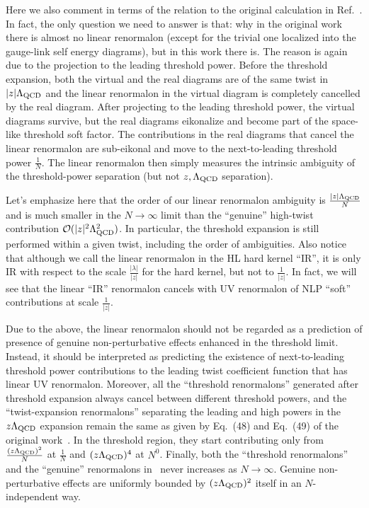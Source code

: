 \documentclass[a4paper,11pt]{article}
\begin{document}
Here we also comment in terms of the relation to the original calculation in Ref.~\cite{Braun:2018brg}. In fact, the only question we need to answer is that: why in the original work there is almost no linear renormalon (except for the trivial one localized into the gauge-link self energy diagrams), but in this work there is. The reason is again due to the projection to the leading threshold power. Before the threshold expansion, both the virtual and the real diagrams are of the same twist in $|z|\Lambda_{\rm QCD}$ and the linear renormalon in the virtual diagram is completely cancelled by the real diagram. After projecting to the leading threshold power, the virtual diagrams survive, but the real diagrams eikonalize and become part of the space-like threshold soft factor. The contributions in the real diagrams that cancel the linear renormalon are sub-eikonal and move to the next-to-leading threshold power $\frac{1}{N}$. The linear renormalon then simply measures the intrinsic ambiguity of the threshold-power separation (but not $z,\Lambda_{\rm QCD}$ separation).

Let's emphasize here that the order of our linear renormalon ambiguity is $\frac{|z|\Lambda_{\rm QCD}}{N}$ and is much smaller in the $N\rightarrow \infty$ limit than the ``genuine'' high-twist contribution ${\cal O}(|z|^2\Lambda^2_{\rm QCD})$. In particular, the threshold expansion is still performed within a given twist, including the order of ambiguities. Also notice that although we call the linear renormalon in the HL hard kernel ``IR'', it is only IR with respect to the scale $\frac{|\lambda|}{|z|}$ for the hard kernel, but not to $\frac{1}{|z|}$. In fact, we will see that the linear ``IR'' renormalon cancels with UV renormalon of NLP ``soft'' contributions at scale $\frac{1}{|z|}$. 

Due to the above, the linear renormalon should not be regarded as a prediction of presence of genuine non-perturbative effects enhanced in the threshold limit. Instead, it should be interpreted as predicting the existence of next-to-leading threshold power contributions to the leading twist coefficient function that has linear UV renormalon.  Moreover, all the ``threshold renormalons'' generated after threshold expansion always cancel between different threshold powers,  and the ``twist-expansion renormalons'' separating the leading and high powers in the $z\Lambda_{\rm QCD}$ expansion remain the same as given by Eq.~(48) and Eq.~(49) of the original work~\cite{Braun:2018brg}. In the threshold region, they start contributing only from $\frac{(z\Lambda_{\rm QCD})^2}{N}$ at $\frac{1}{N}$ and $(z\Lambda_{\rm QCD})^4$ at $N^0$. Finally, both the ``threshold renormalons'' and the ``genuine'' renormalons in~\cite{Braun:2018brg} never increases as $N\rightarrow \infty$. Genuine non-perturbative effects are uniformly bounded by $(z\Lambda_{\rm QCD})^2$ itself in an $N$-independent way.
\end{document}
